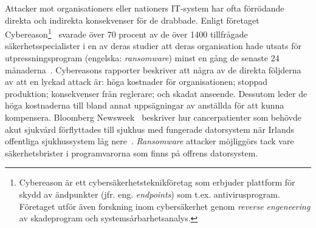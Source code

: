 Attacker mot organisationers eller nationers IT-system har ofta förrödande
direkta och indirekta konsekvenser för de drabbade. Enligt företaget
Cybereason\footnote{Cybereason är ett cybersäkerhetsteknikföretag som erbjuder
plattform för skydd av ändpunkter (jfr. eng. \emph{endpoints}) som t.ex.
antivirusprogram. Företaget utför även forskning inom cybersäkerhet genom
\emph{reverse engeneering} av skadeprogram och
systemsårbarhetsanalys.}~\cite{enwiki:1147596623} svarade över 70 procent av de
över 1400 tillfrågade säkerhetsspecialister i en
av deras studier att deras organisation hade utsats för
utpressningsprogram (engelska: \emph{ransomware}) minst en gång de senaste
24 månaderna~\cite{cyberreason2021, cyberreason2022}. Cybereasons rapporter
beskriver att några av de direkta följderna av att en lyckad attack är: höga
kostnader för organisationen; stoppad produktion; konsekvenser från reglerare;
och skadat anseende. Dessutom leder de höga kostnaderna till
bland annat uppsägningar av anställda för att kunna kompensera. Bloomberg
Newsweek~\cite{gallagher2023} beskriver hur cancerpatienter som behövde akut
sjukvård förflyttades till sjukhus med fungerade datorsystem när Irlands
offentliga sjukhussystem låg nere~\cite{hse_report}. \emph{Ransomware} attacker
möjliggörs tack vare säkerhetsbrister i programvarorna som finns på offrens
datorsystem.
